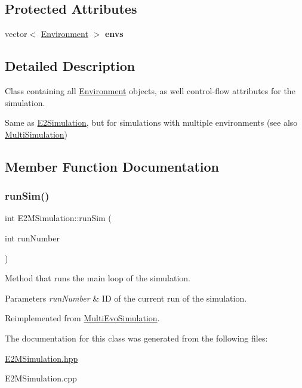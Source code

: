 \subsection*{Protected Attributes}
\begin{DoxyCompactItemize}
\item 
\hypertarget{classE2MSimulation_ae77494b8c30893e459c995f95f671e4b}{}\label{classE2MSimulation_ae77494b8c30893e459c995f95f671e4b} 
vector$<$ \hyperlink{classEnvironment}{Environment} $>$ {\bfseries envs}
\end{DoxyCompactItemize}


\subsection{Detailed Description}
Class containing all \hyperlink{classEnvironment}{Environment} objects, as well control-\/flow attributes for the simulation. 

Same as \hyperlink{classE2Simulation}{E2\+Simulation}, but for simulations with multiple environments (see also \hyperlink{classMultiSimulation}{Multi\+Simulation}) 

\subsection{Member Function Documentation}
\hypertarget{classE2MSimulation_aeac4e92c10f89a5c953ace5b1327d20b}{}\label{classE2MSimulation_aeac4e92c10f89a5c953ace5b1327d20b} 
\subsubsection{\texorpdfstring{run\+Sim()}{runSim()}}
{\footnotesize\ttfamily int E2\+M\+Simulation\+::run\+Sim (\begin{DoxyParamCaption}\item[{int}]{run\+Number }\end{DoxyParamCaption})\hspace{0.3cm}{\ttfamily [virtual]}}



Method that runs the main loop of the simulation. 


\begin{DoxyParams}{Parameters}
{\em run\+Number} & ID of the current run of the simulation. \\
\hline
\end{DoxyParams}


Reimplemented from \hyperlink{classMultiEvoSimulation_a89c9806ac998c06230cdd41cc6a532bf}{Multi\+Evo\+Simulation}.



The documentation for this class was generated from the following files\+:\begin{DoxyCompactItemize}
\item 
\hyperlink{E2MSimulation_8hpp}{E2\+M\+Simulation.\+hpp}\item 
E2\+M\+Simulation.\+cpp\end{DoxyCompactItemize}
